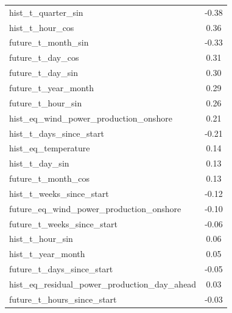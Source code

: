 \begin{xltabular}{\textwidth}{Xc}
    hist\_t\_quarter\_sin                                        & -0.38               \\
    hist\_t\_hour\_cos                                           & 0.36                \\
    future\_t\_month\_sin                                        & -0.33               \\
    future\_t\_day\_cos                                          & 0.31                \\
    future\_t\_day\_sin                                          & 0.30                \\
    future\_t\_year\_month                                       & 0.29                \\
    future\_t\_hour\_sin                                         & 0.26                \\
    hist\_eq\_wind\_power\_production\_onshore                   & 0.21                \\
    hist\_t\_days\_since\_start                                  & -0.21               \\
    hist\_eq\_temperature                                        & 0.14                \\
    hist\_t\_day\_sin                                            & 0.13                \\
    future\_t\_month\_cos                                        & 0.13                \\
    hist\_t\_weeks\_since\_start                                 & -0.12               \\
    future\_eq\_wind\_power\_production\_onshore                 & -0.10               \\
    future\_t\_weeks\_since\_start                               & -0.06               \\
    hist\_t\_hour\_sin                                           & 0.06                \\
    hist\_t\_year\_month                                         & 0.05                \\
    future\_t\_days\_since\_start                                & -0.05               \\
    hist\_eq\_residual\_power\_production\_day\_ahead            & 0.03                \\
    future\_t\_hours\_since\_start                               & -0.03               \\

\end{xltabular}
